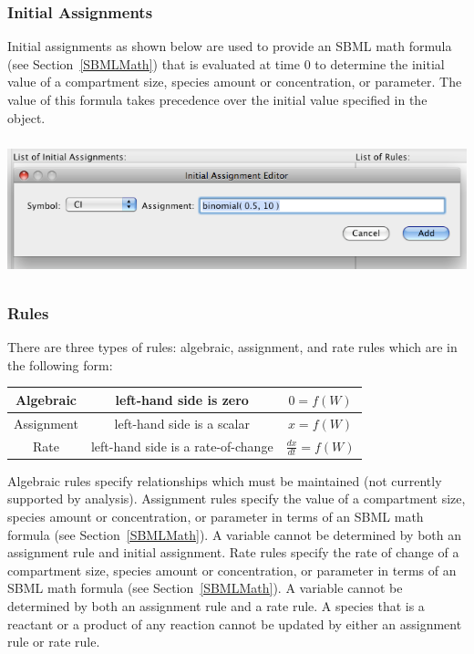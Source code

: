 \documentclass[titlepage,11pt]{article}
\begin{document}
\subsubsection{\label{initials}Initial Assignments}

\noindent
Initial assignments as shown below are used to provide an SBML math formula 
(see Section~\ref{SBMLMath}) that is evaluated at time 0 to determine 
the initial value of a compartment size, species amount or
concentration, or parameter.  The value of this formula takes precedence over
the initial value specified in the object.  
\begin{center}
\includegraphics[height=40mm]{screenshots/initial}
\end{center}

\subsubsection{\label{rules}Rules}

\noindent
There are three types of rules: algebraic, assignment, and rate rules
which are in the following form:
\begin{center}
\begin{tabular}{|c|c|c|}
\hline
Algebraic  & left-hand side is zero             & $0 = f(W)$ \\ \hline
Assignment & left-hand side is a scalar         & $x = f(W)$ \\ \hline
Rate       & left-hand side is a rate-of-change & $\frac{dx}{dt} = f(W)$ 
\\ \hline
\end{tabular}
\end{center}
Algebraic rules specify relationships which must be maintained 
(not currently supported by analysis).  Assignment rules specify 
the value of a compartment size, species amount or concentration, or
parameter in terms of an SBML math formula (see
Section~\ref{SBMLMath}).  A variable cannot be determined by
both an assignment rule and initial assignment.  Rate rules specify
the rate of change of a compartment size, species amount or
concentration, or parameter in terms of an SBML math formula
(see Section~\ref{SBMLMath}).  A variable cannot be determined 
by both an assignment rule and a rate rule.  A species that is 
a reactant or a product of any reaction cannot be updated by either
an assignment rule or rate rule.
\end{document}

